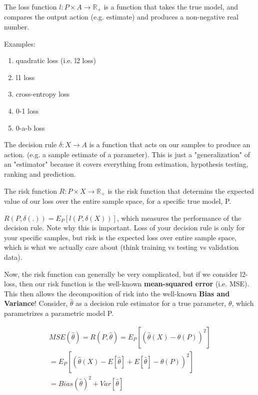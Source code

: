     \begin{definition}{The loss function}
    $l: P \times A \rightarrow \mathbb{R}_+$ is a function that takes the true model, and compares the output action (e.g. estimate) and produces a non-negative real number.

    Examples: 
    \begin{enumerate}
      \item quadratic loss (i.e. l2 loss)
      \item l1 loss
      \item cross-entropy loss
      \item 0-1 loss
      \item 0-a-b loss
    \end{enumerate}
    \end{definition}

    \begin{definition}{The decision rule}
    $\delta: X \rightarrow A$ is a function that acts on our samples to produce an action. (e.g. a sample estimate of a parameter). This is just a "generalization" of an "estimator" because it covers everything from estimation, hypothesis testing, ranking and prediction.
    \end{definition}


    \begin{definition}{The risk function}
      $R: P \times X \rightarrow \mathbb{R}_+$ is the risk function that determins the expected value of our loss over the entire sample space, for a specific true model, P. 

      $R(P, \delta(.)) = E_P [ l(P, \delta(X)) ]$, which measures the performance of the decision rule. Note why this is important. Loss of your decision rule is only for your specific samples, but risk is the expected loss over entire sample space, which is what we actually care about (think training vs testing vs validation data).
    \end{definition}

    Now, the risk function can generally be very complicated, but if we consider l2-loss, then our risk function is the well-known \textbf{mean-squared error} (i.e. MSE). This then allows the decomposition of risk into the well-known \textbf{Bias and Variance}! Consider, $\hat{\theta}$ as a decision rule estimator for a true parameter, $\theta$, which parametrizes a parametric model P.

    \begin{align}
      MSE(\hat{\theta}) = R(P, \hat{\theta}) = E_P [ (\hat{\theta}(X) - \theta(P))^2 ]\\
      = E_P [ (\hat{\theta}(X) - E[\hat{\theta}] + E[\hat{\theta}] - \theta(P))^2 ] \\
      = Bias(\hat{\theta})^2 + Var[\hat{\theta}]
    \end{align}

